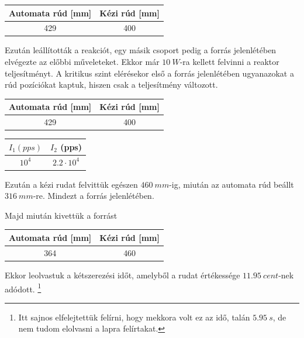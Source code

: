 \documentclass[a4paper,12pt]{article}
\begin{document}
\begin{center}
\begin{tabular}{|c|c|} \hline
Automata rúd [mm] & Kézi rúd [mm] \\ \hline
429 & 400 \\ \hline
\end{tabular}
\end{center}

\par Ezután leállították a reakciót, egy másik csoport pedig a forrás jelenlétében elvégezte az előbbi műveleteket. Ekkor már $10~W$-ra kellett felvinni a reaktor teljesítményt. A kritikus szint elérésekor első a forrás jelenlétében ugyanazokat a rúd pozíciókat kaptuk, hiszen csak a teljesítmény változott.

\begin{center}
\begin{tabular}{|c|c|} \hline
Automata rúd [mm] & Kézi rúd [mm] \\ \hline
429 & 400 \\ \hline
\end{tabular}
\end{center}

\vspace{.2cm}

\begin{center}
\begin{tabular}{|c|c|} \hline
$I_{1} (pps)$ & $I_{2}$ (pps) \\ \hline
$10^{4}$ & $2.2 \cdot 10^{4}$ \\ \hline
\end{tabular}
\end{center}

\par Ezután a kézi rudat felvittük egészen $460~mm$-ig, miután az automata rúd beállt $316~mm$-re. Mindezt a forrás jelenlétében.

\par Majd miután kivettük a forrást

\begin{center}
\begin{tabular}{|c|c|} \hline
Automata rúd [mm] & Kézi rúd [mm] \\ \hline
364 & 460 \\ \hline
\end{tabular}
\end{center}

\par Ekkor leolvastuk a kétszerezési időt, amelyből a rudat értékessége $11.95~cent$-nek adódott. \footnote{Itt sajnos elfelejtettük felírni, hogy mekkora volt ez az idő, talán $5.95~s$, de nem tudom elolvasni a lapra felírtakat.}
\end{document}
